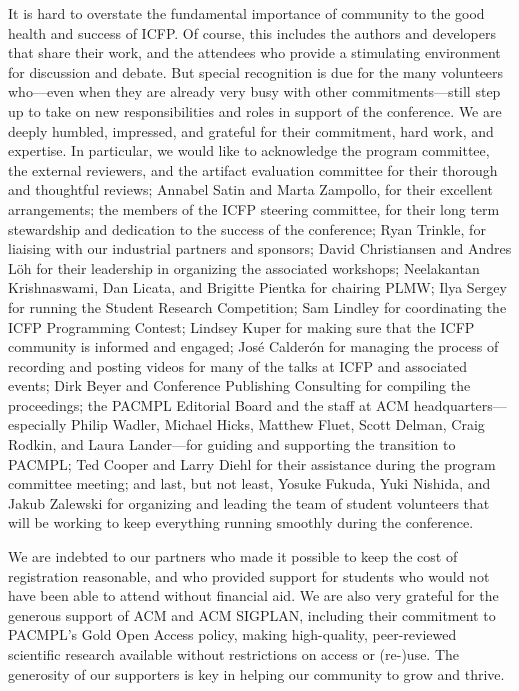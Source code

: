 It is hard to overstate the fundamental importance of community to the good health and success of ICFP. Of course, this includes the authors and developers that share their work, and the attendees who provide a stimulating environment for discussion and debate. But special recognition is due for the many volunteers who---even when they are already very busy with other commitments---still step up to take on new responsibilities and roles in support of the conference. We are deeply humbled, impressed, and grateful for their commitment, hard work, and expertise. In particular, we would like to acknowledge the program committee, the external reviewers, and the artifact evaluation committee for their thorough and thoughtful reviews; Annabel Satin and Marta Zampollo, for their excellent arrangements; the members of the ICFP steering committee, for their long term stewardship and dedication to the success of the conference; Ryan Trinkle, for liaising with our industrial partners and sponsors; David Christiansen and Andres Löh for their leadership in organizing the associated workshops; Neelakantan Krishnaswami, Dan Licata, and Brigitte Pientka for chairing PLMW; Ilya Sergey for running the Student Research Competition; Sam Lindley for coordinating the ICFP Programming Contest; Lindsey Kuper for making sure that the ICFP community is informed and engaged; José Calderón for managing the process of recording and posting videos for many of the talks at ICFP and associated events; Dirk Beyer and Conference Publishing Consulting for compiling the proceedings; the PACMPL Editorial Board and the staff at ACM headquarters---especially Philip Wadler, Michael Hicks, Matthew Fluet, Scott Delman, Craig Rodkin, and Laura Lander---for guiding and supporting the transition to PACMPL; Ted Cooper and Larry Diehl for their assistance during the program committee meeting; and last, but not least, Yosuke Fukuda, Yuki Nishida, and Jakub Zalewski for organizing and leading the team of student volunteers that will be working to keep everything running smoothly during the conference.

We are indebted to our partners who made it possible to keep the cost of registration reasonable, and who provided support for students who would not have been able to attend without financial aid. We are also very grateful for the generous support of ACM and ACM SIGPLAN, including their commitment to PACMPL's Gold Open Access policy, making high-quality, peer-reviewed scientific research available without restrictions on access or (re-)use. The generosity of our supporters is key in helping our community to grow and thrive.

